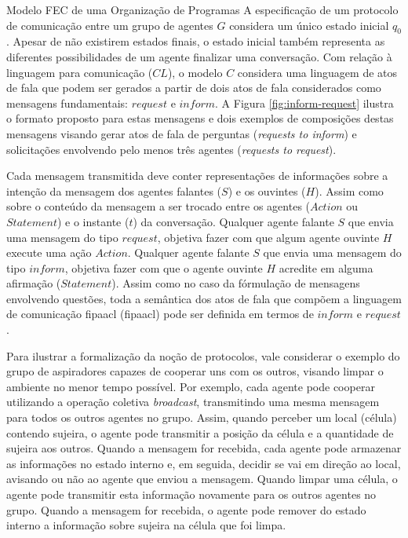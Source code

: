 \begin{section}{Modelo FEC de uma Organização de Programas}
        A especificação de um protocolo de comunicação entre um grupo de agentes $G$ considera um único estado inicial $q_0$. Apesar de não existirem estados finais, o estado inicial também representa as diferentes possibilidades de um agente finalizar uma conversação. Com relação à linguagem para comunicação ($CL$), o modelo $C$ considera uma linguagem de atos de fala que podem ser gerados a partir de dois atos de fala considerados como mensagens fundamentais: $request$ e $inform$. A Figura \ref{fig:inform-request} ilustra o formato proposto para estas mensagens e dois exemplos de composições destas mensagens visando gerar atos de fala de perguntas (\textit{requests to inform}) e solicitações envolvendo pelo menos três agentes (\textit{requests to request}). 
    
        \begin{figure}[h!]
            \centering
        \end{figure}
            
        Cada mensagem transmitida deve conter representações de informações sobre a intenção da mensagem dos agentes falantes ($S$) e os ouvintes ($H$). Assim como sobre o conteúdo da mensagem a ser trocado entre os agentes ($Action$ ou $Statement$) e o instante ($t$) da conversação. Qualquer agente falante $S$ que envia uma mensagem do tipo $request$, objetiva fazer com que algum agente ouvinte $H$ execute uma ação $Action$. Qualquer agente falante $S$ que envia uma mensagem do tipo $inform$, objetiva fazer com que o agente ouvinte $H$ acredite em alguma afirmação ($Statement$). Assim como no caso da fórmulação de mensagens envolvendo questões, toda a semântica dos atos de fala que compõem a linguagem de comunicação \acrshort{fipaacl} (\acrlong{fipaacl}) pode ser definida em termos de $inform$ e $request$.
        
        Para ilustrar a formalização da noção de protocolos, vale considerar o exemplo do grupo de aspiradores capazes de cooperar uns com os outros, visando limpar o ambiente no menor tempo possível. Por exemplo, cada agente pode cooperar utilizando a operação coletiva \textit{broadcast}, transmitindo uma mesma mensagem para todos os outros agentes no grupo. Assim, quando perceber um local (célula) contendo sujeira, o agente pode transmitir a posição da célula e a quantidade de sujeira aos outros. Quando a mensagem for recebida, cada agente pode armazenar as informações no estado interno e, em seguida, decidir se vai em direção ao local, avisando ou não ao agente que enviou a mensagem. Quando limpar uma célula, o agente pode transmitir esta informação novamente para os outros agentes no grupo. Quando a mensagem for recebida, o agente pode remover do estado interno a informação sobre sujeira na célula que foi limpa.
        

\end{section}

